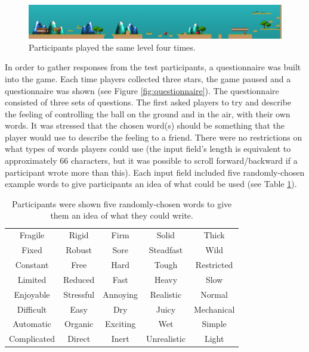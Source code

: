 \begin{figure}[htbp]
\centering
\includegraphics[width=1\textwidth]{Pics/levelStructure}
\caption{Participants played the same level four times.}
\label{fig:level}
\end{figure}

In order to gather responses from the test participants, a questionnaire was built into the game. Each time players collected three stars, the game paused and a questionnaire was shown (see Figure \ref{fig:questionnaire}). The questionnaire consisted of three sets of questions. The first asked players to try and describe the feeling of controlling the ball on the ground and in the air, with their own words. It was stressed that the chosen word(s) should be something that the player would use to describe the feeling to a friend. There were no restrictions on what types of words players could use (the input field's length is equivalent to approximately 66 characters, but it was possible to scroll forward/backward if a participant wrote more than this). Each input field included five randomly-chosen example words to give participants an idea of what could be used (see Table \ref{table:wordsExamples}).

\begin{table} \centering
\scriptsize
\caption{Participants were shown five randomly-chosen words to give them an idea of what they could write.}
\label{table:wordsExamples}
\begin{tabular}{ccccc}
\toprule
Fragile & Rigid & Firm & Solid & Thick\\
Fixed & Robust & Sore & Steadfast & Wild\\
Constant & Free & Hard & Tough & Restricted\\
Limited & Reduced & Fast & Heavy & Slow\\
Enjoyable & Stressful & Annoying & Realistic & Normal\\
Difficult & Easy & Dry & Juicy & Mechanical\\
Automatic & Organic & Exciting & Wet & Simple\\
Complicated & Direct & Inert & Unrealistic & Light\\
\bottomrule
\end{tabular}
\end{table}

